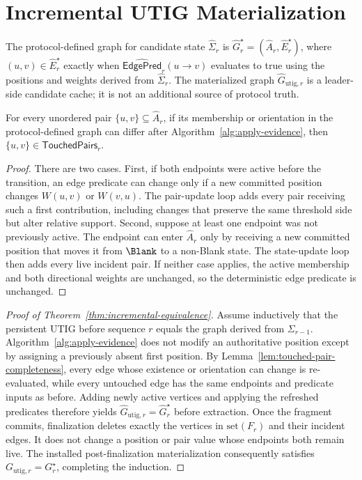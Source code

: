 \section{Incremental UTIG Materialization}
\label{app:incremental-materialization}

The protocol-defined graph for candidate state $\widehat\Sigma_r$ is
$\widehat G_r^\star=(\widehat A_r,\widehat E_r^\star)$, where
$(u,v)\in\widehat E_r^\star$ exactly when
$\widehat{\mathsf{EdgePred}}_r(u\to v)$ evaluates to true using the positions and
weights derived from $\widehat\Sigma_r$.  The materialized graph
$\widehat G_{\mathrm{utig},r}$ is a leader-side candidate cache; it is not an
additional source of protocol truth.

\begin{lemma}
\label{lem:touched-pair-completeness}
For every unordered pair $\{u,v\}\subseteq\widehat A_r$, if its membership or
orientation in the protocol-defined graph can differ after
Algorithm~\ref{alg:apply-evidence}, then
$\{u,v\}\in\mathsf{TouchedPairs}_r$.
\end{lemma}

\begin{proof}
There are two cases.  First, if both endpoints were active before the
transition, an edge predicate can change only if a new committed position
changes $W(u,v)$ or $W(v,u)$.  The pair-update loop adds every pair receiving
such a first contribution, including changes that preserve the same threshold
side but alter relative support.  Second, suppose at least one endpoint was
not previously active.  The endpoint can enter $\widehat A_r$ only by receiving
a new committed position that moves it from $\Blank$ to a non-Blank state.
The state-update loop then adds every live incident pair.  If neither case
applies, the active membership and both directional weights are unchanged, so
the deterministic edge predicate is unchanged.
\end{proof}

\begin{proof}[Proof of Theorem~\ref{thm:incremental-equivalence}]
Assume inductively that the persistent UTIG before sequence $r$ equals the graph
derived from $\Sigma_{r-1}$.  Algorithm~\ref{alg:apply-evidence} does not modify
an authoritative position except by assigning a previously absent first
position.  By Lemma~\ref{lem:touched-pair-completeness}, every edge whose
existence or orientation can change is re-evaluated, while every untouched
edge has the same endpoints and predicate inputs as before.  Adding newly
active vertices and applying the refreshed predicates therefore yields
$\widehat G_{\mathrm{utig},r}=\widehat G_r^\star$ before extraction.  Once the
fragment commits, finalization deletes exactly the vertices in
$\mathrm{set}(F_r)$ and their incident edges.
It does not change a position or pair value whose endpoints both remain live.
The installed post-finalization materialization consequently satisfies
$G_{\mathrm{utig},r}=G_r^\star$, completing the induction.
\end{proof}

